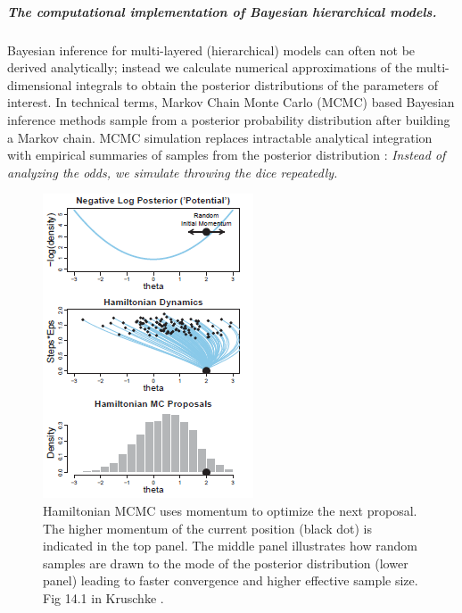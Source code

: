 \documentclass[11pt,notitlepage]{article}
\begin{document}
\subparagraph*{The computational implementation of Bayesian hierarchical models.}
Bayesian inference for multi-layered (hierarchical) models can often not be derived analytically; instead we calculate numerical approximations of the multi-dimensional integrals to obtain the posterior distributions of the parameters of interest. In technical terms, Markov Chain Monte Carlo (MCMC) based Bayesian inference methods sample from a posterior probability distribution after building a Markov chain. MCMC simulation replaces intractable analytical integration with empirical summaries of samples from the posterior distribution \cite{Abrams_9483729}: \textit{Instead of analyzing the odds, we simulate throwing the dice repeatedly.}

\begin{figure}
 \vspace{-90pt}
 \includegraphics[scale=1]{Figures/Hamiltonian.png}
  \vspace{-30pt}
  \caption{\footnotesize Hamiltonian MCMC uses momentum to optimize the next proposal. The higher momentum of the current position (black dot) is indicated in the top panel. The middle panel illustrates how random samples are drawn to the mode of the posterior distribution (lower panel) leading to faster convergence and higher effective sample size. Fig 14.1 in Kruschke \cite{Kruschke_Book_2014}.}
    \label{fig:Hamiltonian}
 \vspace{- 10 pt}
\end{figure}
\end{document}

